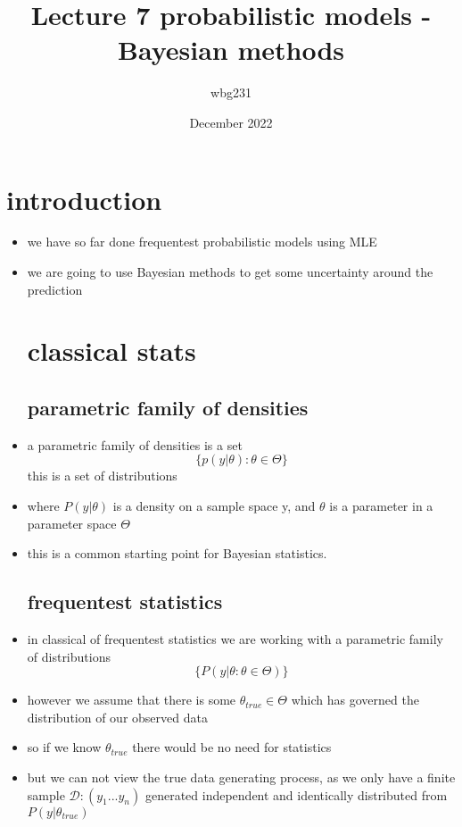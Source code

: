 \documentclass{article}
\title{Lecture 7 probabilistic models - Bayesian methods}
\author{wbg231 }
\date{December 2022}
\begin{document}
\maketitle

\section{introduction}
\begin{itemize}
\item we have so far done frequentest probabilistic models using MLE 
\item we are going to use Bayesian methods to get some uncertainty around the prediction 
\section{classical stats}
\subsection{parametric family of densities }
\item a parametric family of densities is a set $$\{p(y|\theta):\theta\in \Theta\}$$ this is a set of distributions
\item where $P(y|\theta)$ is a density on a sample space y, and $\theta$ is a parameter in a parameter space $\Theta$
\item  this is a common starting point for Bayesian statistics. 
\subsection*{frequentest statistics}
\item in classical of frequentest statistics we are working with a parametric family of distributions $$\{P(y|\theta: \theta\in \Theta)\}$$
\item however we assume that there is some $\theta_{true}\in\Theta$ which has governed the distribution of our observed data 
\item so if we know $\theta_{true}$ there would be no need for statistics
\item but we can not view the true data generating process, as we only have a finite sample $\mathcal{D}:(y_1...y_n)$ generated independent  and identically distributed  from $P(y|\theta_{true})$

\end{itemize}
\end{document}

